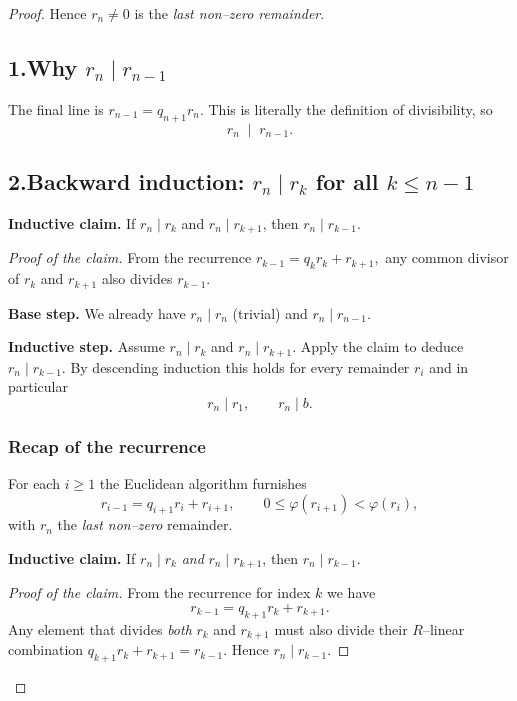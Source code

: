 \documentclass[12pt]{article}
\theoremstyle{definition} %
\theoremstyle{plain} %
\begin{document}
\begin{proof}
Hence \(r_{n}\neq0\) is the \emph{last non–zero remainder}.

\bigskip
\subsection*{1.\;Why \(r_{n}\mid r_{n-1}\)}

The final line is \(r_{n-1}=q_{n+1}r_{n}\).  
This is literally the definition of divisibility, so
\[
   r_{n}\;\mid\;r_{n-1}.
\]

\bigskip
\subsection*{2.\;Backward induction: \(r_{n}\mid r_{k}\) for all \(k\le n-1\)}

\textbf{Inductive claim.}  
If \(r_{n}\mid r_{k}\) and \(r_{n}\mid r_{k+1}\), then \(r_{n}\mid r_{k-1}\).

\emph{Proof of the claim.}  
From the recurrence
\(
   r_{k-1}=q_{k}r_{k}+r_{k+1},
\)
any common divisor of \(r_{k}\) and \(r_{k+1}\) also divides \(r_{k-1}\).

\medskip
\textbf{Base step.}  
We already have \(r_{n}\mid r_{n}\) (trivial) and \(r_{n}\mid r_{n-1}\).

\textbf{Inductive step.}  
Assume \(r_{n}\mid r_{k}\) and \(r_{n}\mid r_{k+1}\).
Apply the claim to deduce \(r_{n}\mid r_{k-1}\).
By descending induction this holds for every remainder \(r_{i}\) and in
particular
\[
   r_{n}\mid r_{1},
   \qquad
   r_{n}\mid b.
\]

\subsubsection*{Recap of the recurrence}
For each $i\ge1$ the Euclidean algorithm furnishes
\[
   r_{i-1}=q_{i+1}r_{i}+r_{i+1},
   \qquad
   0\le \varphi(r_{i+1})<\varphi(r_{i}),
\]
with $r_{n}$ the \emph{last non–zero} remainder.

\bigskip
\textbf{Inductive claim.}\;
If $r_{n}\mid r_{k}$ \emph{and} $r_{n}\mid r_{k+1}$, then $r_{n}\mid r_{k-1}$.

\begin{proof}[Proof of the claim]
From the recurrence for index $k$ we have
\[
   r_{k-1}=q_{k+1}r_{k}+r_{k+1}.
\]
Any element that divides \emph{both} $r_{k}$ and $r_{k+1}$ must also
divide their $R$–linear combination $q_{k+1}r_{k}+r_{k+1}=r_{k-1}$.
Hence $r_{n}\mid r_{k-1}$.
\end{proof}


\end{proof}
\end{document}
